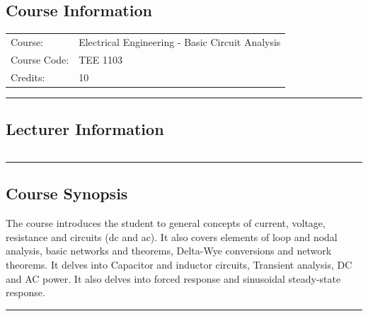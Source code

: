
\subsection*{Course Information}
\vspace{0ex}%
\noindent\parbox{0.5\textwidth}{%
    \noindent\begin{tabular}{@{}ll}
                 \textsf{Course:}          & Electrical Engineering - Basic Circuit Analysis \\
                 \textsf{Course Code:}         & 	TEE 1103    \\
                 \textsf{Credits:}    & 	10
    \end{tabular}}
\vspace{2ex}\hrule\vspace{2ex}

\subsection*{Lecturer Information}
\noindent\parbox{0.5\textwidth}{%
    \noindent\begin{tabular}{@{}ll}
                 
    \end{tabular}}
\vspace{2ex}\hrule\vspace{2ex}


\subsection*{Course Synopsis}
The course introduces the student to general concepts of current, voltage, resistance and circuits (dc and ac).
It also covers elements of loop and nodal analysis, basic networks and theorems, Delta-Wye conversions and network theorems.
It delves into Capacitor and inductor circuits, Transient analysis, DC and AC power.
It also delves into forced response and sinusoidal steady-state response.
\vspace{2ex} \hrule\vspace{2ex}
